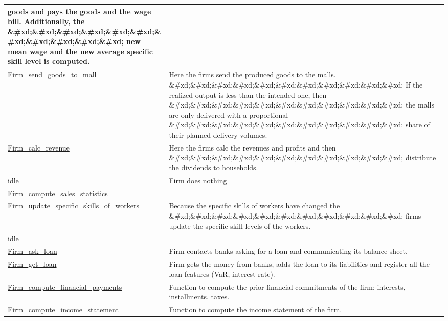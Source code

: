 \documentclass[a4paper,11pt]{article}
\begin{document}
\begin{landscape}
\begin{longtable}[H!]{ll}
{ goods and pays the goods and   the wage bill. Additionally, the \&\#xd;\&\#xd;\&\#xd;\&\#xd;\&\#xd;\&\#xd;\&\#xd;\&\#xd;\&\#xd;\&\#xd;\&\#xd;
 new mean wage and the new average specific skill level is computed.} \\
\midrule
\url{Firm_send_goods_to_mall} \index{\url{Firm_send_goods_to_mall}} & \parbox{10cm}{Here the firms send the produced goods to the malls. \&\#xd;\&\#xd;\&\#xd;\&\#xd;\&\#xd;\&\#xd;\&\#xd;\&\#xd;\&\#xd;\&\#xd;\&\#xd;
If the realized output is less than the intended one, then \&\#xd;\&\#xd;\&\#xd;\&\#xd;\&\#xd;\&\#xd;\&\#xd;\&\#xd;\&\#xd;\&\#xd;\&\#xd;
the malls are only delivered with a proportional \&\#xd;\&\#xd;\&\#xd;\&\#xd;\&\#xd;\&\#xd;\&\#xd;\&\#xd;\&\#xd;\&\#xd;\&\#xd;
share of their planned delivery volumes.} \\
\midrule
\url{Firm_calc_revenue}  & \parbox{10cm}{Here the firms calc the revenues and profits and then \&\#xd;\&\#xd;\&\#xd;\&\#xd;\&\#xd;\&\#xd;\&\#xd;\&\#xd;\&\#xd;\&\#xd;\&\#xd;
distribute the dividends to households.} \\
\midrule
\url{idle}  & \parbox{10cm}{Firm does nothing} \\
\midrule
\url{Firm_compute_sales_statistics}  & \parbox{10cm}{} \\
\midrule
\url{Firm_update_specific_skills_of_workers}  & \parbox{10cm}{Because the specific skills of workers have changed the \&\#xd;\&\#xd;\&\#xd;\&\#xd;\&\#xd;\&\#xd;\&\#xd;\&\#xd;\&\#xd;\&\#xd;\&\#xd;
firms update the specific skill levels of the workers.} \\
\midrule
\url{idle}  & \parbox{10cm}{} \\
\midrule
\url{Firm_ask_loan}  & \parbox{10cm}{Firm contacts banks asking for a loan and communicating its balance sheet.} \\
\midrule
\url{Firm_get_loan}  & \parbox{10cm}{Firm gets the money from banks, adds the loan to its liabilities and register all the loan features (VaR, interest rate).} \\
\midrule
\url{Firm_compute_financial_payments}  & \parbox{10cm}{Function to compute the prior financial commitments of the firm: interests, installments, taxes.} \\
\midrule
\url{Firm_compute_income_statement}  & \parbox{10cm}{Function to compute the income statement of the firm.} \\

\end{longtable}
\end{landscape}
\end{document}
